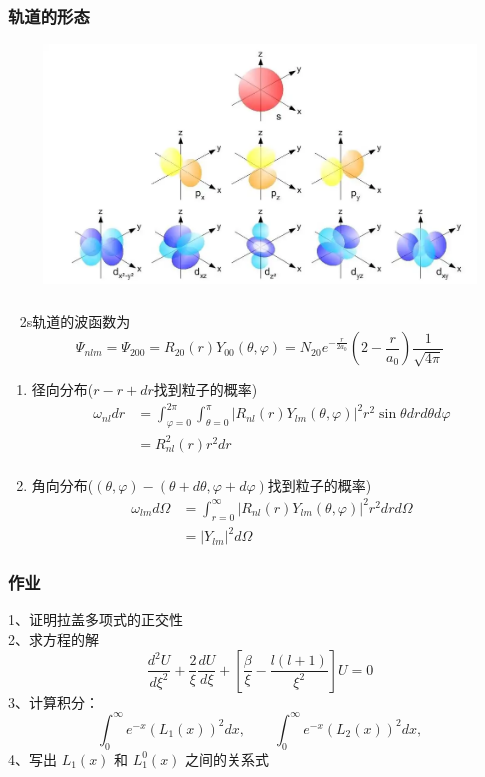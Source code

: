 \begin{frame}
	  \frametitle{轨道的形态}
		\begin{center}
			 \includegraphics[width=1.0\textwidth,height=2.5in]{figs/2022-03-25-19-35-50.png}
		\end{center}	 
\end{frame}	

\begin{frame}
	  \frametitle{}
	  \例 [1.求2s轨道的形态]{}
	  \解~ 2s轨道的波函数为\[  \Psi_{nlm} = \Psi_{200} = R_{20} (r) Y_{00}(\theta,\varphi) = N_{20} e^{-\frac{r}{2a_0}} (2-\frac{r}{a_0})\frac{1}{\sqrt{4\pi}}\]
	  \begin{enumerate}
		  \item 径向分布($r-r+dr$找到粒子的概率)
		   \[ \begin{aligned}
	    \omega_{nl} dr &= \int _{\varphi=0} ^{2\pi} \int _{\theta=0} ^{\pi} |R_{nl}(r)Y_{lm}(\theta,\varphi)|^2 r^2\sin \theta dr d\theta d \varphi \\
		&= R^2_{nl}(r) r^2 dr \\
		\end{aligned}\]
		\item 角向分布($(\theta,\varphi)-(\theta+d\theta,\varphi+d\varphi)$找到粒子的概率)		
		\[ \begin{aligned}
			\omega_{lm} d \Omega &= \int _{r=0} ^{\infty} |R_{nl}(r)Y_{lm}(\theta,\varphi)|^2 r^2dr  d \Omega \\
			&= |Y_{lm}|^2 d \Omega 	
			\end{aligned}\]		
	  \end{enumerate}  
\end{frame}
\begin{frame}
	\frametitle{作业}
	1、证明拉盖多项式的正交性\\
	2、求方程的解
	\begin{equation*}
		\frac{d^2 U}{d \xi ^2} + \frac{2}{\xi }\frac{d U }{d \xi}  +[\frac{\beta}{\xi} - \frac{l(l+1)}{\xi ^2}] U=0
	\end{equation*}	 
	3、计算积分：
	\begin{equation*}
		\int_{0}^{\infty}   e^{-x} ( L_1 (x) )^2 dx, \qquad  \int_{0}^{\infty}   e^{-x} ( L_2 (x) )^2 dx, 
	\end{equation*}	
	4、写出 $L_1 (x)$ 和 $L_1 ^0 (x)$ 之间的关系式
\end{frame}		

